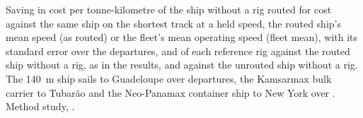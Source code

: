 \begin{table}[tbp]
\centering
\footnotesize
\caption{ Saving in cost per tonne-kilometre of the ship without a rig routed for cost against the same ship on the shortest track at a held speed, the routed ship's mean speed (as routed) or the fleet's mean operating speed (fleet mean), with its standard error over the departures, and of each reference rig against the routed ship without a rig, as in the results, and against the unrouted ship without a rig. The \SI{140}{m} ship sails to Guadeloupe over \NumRoutingDepartures{} departures, the Kamsarmax bulk carrier to Tubarão and the Neo-Panamax container ship to New York over \NumRoutingSampled. Method study, .}
\label{tab:routing_value}
\end{table}
